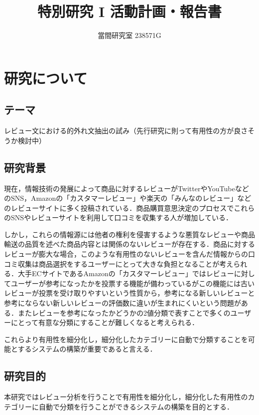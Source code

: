 \documentclass[platex,dvipdfmx,a4paper,twocolumn,base=10.5pt,jbase=10.5pt,ja=standard]{bxjsarticle}
\title{特別研究 I 活動計画・報告書}{Special Research I Activity Plan and Report}
\author{當間研究室 238571G}{屋比久 博文}{Hirofumi Yabiku, Toma lab}
\begin{document}
\maketitle
\section{研究について}
\subsection{テーマ}
レビュー文における的外れ文抽出の試み（先行研究に則って有用性の方が良さそうか検討中）
\subsection{研究背景}
現在，情報技術の発展によって商品に対するレビューがTwitterやYouTubeなどのSNS，Amazonの「カスタマーレビュー」や楽天の「みんなのレビュー」などのレビューサイトに多く投稿されている．商品購買意思決定のプロセスでこれらのSNSやレビューサイトを利用して口コミを収集する人が増加している\cite{source1}．\par
しかし，これらの情報源には他者の権利を侵害するような悪質なレビューや商品輸送の品質を述べた商品内容とは関係のないレビューが存在する．商品に対するレビューが膨大な場合，このような有用性のないレビューを含んだ情報からの口コミ収集は商品選択をするユーザーにとって大きな負担となることが考えられる．大手ECサイトであるAmazonの「カスタマーレビュー」ではレビューに対してユーザーが参考になったかを投票する機能が備わっているがこの機能には古いレビューが投票を受け取りやすいという性質から，参考になる新しいレビューと参考にならない新しいレビューの評価数に違いが生まれにくいという問題がある．またレビューを参考になったかどうかの2値分類で表すことで多くのユーザーにとって有意な分類にすることが難しくなると考えられる．\par
これらより有用性を細分化し，細分化したカテゴリーに自動で分類することを可能とするシステムの構築が重要であると言える．

 \subsection{研究目的}
 本研究ではレビュー分析を行うことで有用性を細分化し，細分化した有用性のカテゴリーに自動で分類を行うことができるシステムの構築を目的とする．
\end{document}
